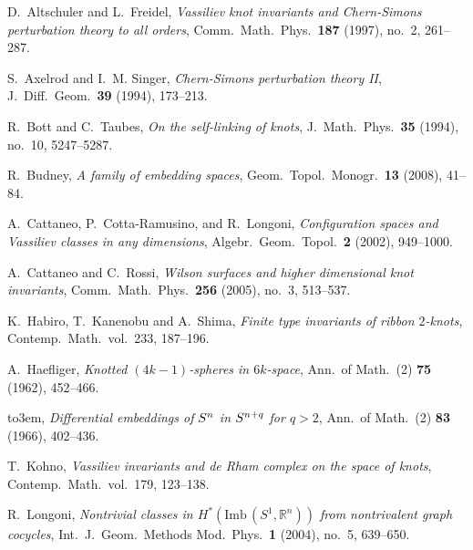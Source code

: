 \documentclass{amsart}
\theoremstyle{plain}
\theoremstyle{definition}
\newcommand{\R}{\mathbb{R}}
\numberwithin{equation}{section}
\numberwithin{figure}{section}
\numberwithin{table}{section}
\begin{document}
%
\providecommand{\bysame}{\leavevmode\hbox to3em{\hrulefill}\thinspace}
\providecommand{\MR}{\relax\ifhmode\unskip\space\fi MR }
\providecommand{\MRhref}[2]{%
  \href{http://www.ams.org/mathscinet-getitem?mr=#1}{#2}
}
\providecommand{\href}[2]{#2}
\begin{thebibliography}{10}

D.~Altschuler and L.~Freidel, \emph{Vassiliev knot invariants and Chern-Simons perturbation theory to all orders},
 Comm.\ Math.\ Phys.\ \textbf{187} (1997), no.~2, 261--287.

S.~Axelrod and I.~M. Singer, \emph{Chern-Simons perturbation theory II},
 J.\ Diff.\ Geom.\ \textbf{39} (1994), 173--213.

R.~Bott and C.~Taubes, \emph{On the self-linking of knots},
 J.\ Math.\ Phys.\ \textbf{35} (1994), no.~10, 5247--5287.

R.~Budney, \emph{A family of embedding spaces},
 Geom.\ Topol.\ Monogr.\ \textbf{13} (2008), 41--84.

A.~Cattaneo, P.~Cotta-Ramusino, and R.~Longoni, \emph{Configuration spaces and Vassiliev classes in any dimensions},
 Algebr.\ Geom.\ Topol.\ \textbf{2} (2002), 949--1000.

A.~Cattaneo and C.~Rossi, \emph{Wilson surfaces and higher dimensional knot invariants},
 Comm.\ Math.\ Phys.\ \textbf{256} (2005), no.~3, 513--537.

K.~Habiro, T.~Kanenobu and A.~Shima, \emph{Finite type invariants of ribbon $2$-knots},
 Contemp.\ Math.\ vol.\ 233, 187--196.

A.~Haefliger, \emph{Knotted $(4k-1)$-spheres in $6k$-space},
 Ann.\ of Math.\ (2) \textbf{75} (1962), 452--466.

\bysame, \emph{Differential embeddings of $S\sp{n}$ in $S\sp{n+q}$ for $q>2$},
 Ann.\ of Math.\ (2) \textbf{83} (1966), 402--436.

T.~Kohno, \emph{Vassiliev invariants and de Rham complex on the space of knots},
 Contemp.\ Math.\ vol.\ 179, 123--138.

R.~Longoni, \emph{Nontrivial classes in $H^*(\text{Imb}\, (S^1 ,\R^n ))$ from nontrivalent graph cocycles},
 Int.\ J.\ Geom.\ Methods Mod.\ Phys.\ \textbf{1} (2004), no.~5, 639--650.


\end{thebibliography}
\end{document}
